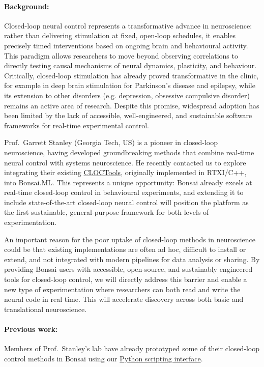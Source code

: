 \paragraph{Background:} Closed-loop neural control represents a transformative
advance in neuroscience:  rather than delivering stimulation at fixed,
open-loop schedules, it enables precisely timed interventions based on ongoing
brain and behavioural activity. This paradigm allows researchers to move beyond
observing correlations to  directly testing causal mechanisms of neural
dynamics, plasticity, and behaviour. Critically, closed-loop stimulation has
already proved transformative in the  clinic, for example in deep brain
stimulation for Parkinson’s disease and  epilepsy, while its extension to other
disorders (e.g. depression, obsessive  compulsive disorder) remains an active
area of research. Despite this promise, widespread adoption has been limited
by the lack of accessible, well-engineered,  and sustainable software
frameworks for real-time experimental control.

Prof.~Garrett Stanley (Georgia Tech, US) is a pioneer in closed-loop
neuroscience, having developed groundbreaking methods that combine real-time
neural control with systems neuroscience. He recently contacted us to explore
integrating their existing \href{https://cloctools.github.io/}{CLOCTools},
originally implemented in RTXI/C++, into Bonsai.ML.  This represents a unique
opportunity: Bonsai already excels at real-time closed-loop control in
behavioural experiments, and extending it to include state-of-the-art
closed-loop neural control will position the platform as the first sustainable,
general-purpose framework for both levels of experimentation.

An important reason for the poor uptake of closed-loop methods in neuroscience
could be that existing implementations are often ad hoc, difficult to install
or  extend, and not integrated with modern pipelines for data analysis or
sharing. By providing Bonsai users with accessible, open-source, and
sustainably engineered tools for closed-loop control, we will directly address
this barrier and enable a new type of experimentation where researchers can
both read and write the neural code in real time. This will accelerate
discovery across both basic and translational neuroscience.

\paragraph{Previous work:} Members of Prof.~Stanley’s lab have already
prototyped some of their closed-loop control methods in Bonsai using our
\href{https://bonsai-rx.org/python-scripting/}{Python scripting interface}.


